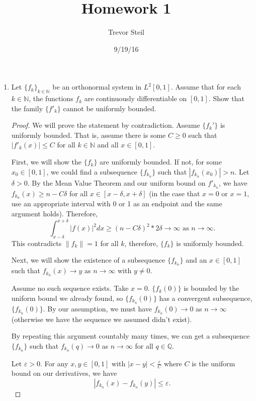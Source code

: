 \documentclass[a4paper]{article}
\title{Homework 1 }
\date{9/19/16}
\author{Trevor Steil}
\newcommand{\N}{\mathbb{N}}
\newcommand{\Q}{\mathbb{Q}}
\begin{document}
\maketitle

\begin{enumerate}

\item Let $\{ f_k \}_{k\in \mathbb N}$ be an orthonormal system in $L^2 [0,1]$. Assume that for each $k\in \mathbb N$, the functions $f_k$ are continuously differentiable on $[0,1]$. Show that the family $\{ f'_k \}$ cannot be uniformly bounded.

  \begin{proof}

    We will prove the statement by contradiction. Assume $\{ f_k' \}$ is uniformly bounded. That is, assume there is some $C \geq 0$ such that
    $|f'_k(x)| \leq C$ for all $k \in \N$ and all $x \in [0,1]$.

    First, we will show the $\{ f_k \}$ are uniformly bounded. If not, for some $x_0 \in [0,1]$, we could find a subsequence $\{ f_{k_n} \}$ such that
    $| f_{k_n}(x_0) | > n$. Let $\delta > 0$. By the Mean Value Theorem and our uniform bound on $f'_{k_n}$, we have $f_{k_n}(x) \geq n - C \delta$
    for all $x \in [x - \delta, x + \delta]$ (in the case that $x=0$ or $x=1$, use an appropriate interval with 0 or 1 as an endpoint and the same
    argument holds). Therefore,
    \[ \int_{x-\delta}^{x+\delta} | f(x) |^2 dx \geq (n - C \delta)^2 * 2\delta \to \infty \text{ as } n \to \infty .\]
    This contradicts $\|f_k\| = 1$ for all $k$, therefore, $\{ f_k \}$ is uniformly bounded.

    Next, we will show the existence of a subsequence $\{ f_{k_n} \}$ and an $x \in [0,1]$ such that $f_{k_n}(x) \to y$ as $n \to \infty$ with $y \neq
    0$.

    Assume no such sequence exists. Take $x = 0$. $\{ f_k(0) \}$ is bounded by the uniform bound we already found, so $\{ f_{k_n}(0) \}$ has a
    convergent subsequence, $\{ f_{k_n} (0) \}$. By our assumption, we must have $f_{k_n}(0) \to 0$ as $n \to \infty$ (otherwise we have the sequence
    we assumed didn't exist).

    By repeating this argument countably many times, we can get a subsequence $\{ f_{k_n} \}$ such that $f_{k_n}(q) \to 0$ as $n \to \infty$ for all
    $q \in \Q$.

    Let $\varepsilon >0$. For any $x,y \in [0,1]$ with $|x-y| < \frac{\varepsilon}{C}$ where $C$ is the uniform bound on our derivatives, we have
    \[ | f_{k_n}(x) - f_{k_n}(y) | \leq \varepsilon .\]


\end{proof}
\end{enumerate}
\end{document}

